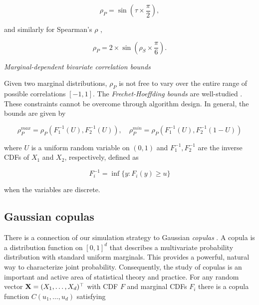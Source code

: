 \documentclass[
]{jss}
\begin{document}
\begin{equation}
\label{eq:convertKendall}
\rho_{P} = \sin \left( \tau \times \frac{\pi}{2} \right), 
\end{equation}

\noindent and similarly for Spearman's \(\rho\) \citep{K58},

\begin{equation}
\label{eq:convertSpearman}
\rho_P = 2 \times \sin \left( \rho_S \times \frac{\pi}{6} \right).
\end{equation}

\emph{Marginal-dependent bivariate correlation bounds}

Given two marginal distributions, \(\rho_P\) is not free to vary over the entire range of possible correlations \([-1,1]\). The \emph{Frechet-Hoeffding bounds} are well-studied \citep{Nelsen2007, BF17}. These constraints cannot be overcome through algorithm design. In general, the bounds are given by

\begin{equation}
\label{eq:frechet}
\rho_P^{max} = \rho_P \left( F^{-1}_1 (U), F^{-1}_2 (U) \right), \quad \rho_P^{min} = \rho_P \left( F^{-1}_1 (U), F^{-1}_2 (1 - U) \right)
\end{equation}

\noindent where \(U\) is a uniform random variable on \((0,1)\) and \(F^{-1}_1, F^{-1}_2\) are the inverse CDFs of \(X_1\) and \(X_2\), respectively, defined as

\begin{equation}
F_{i}^{-1} = \inf\{y:F_{i}(y) \geq u \}
\label{eq:inverseCDF}
\end{equation}

when the variables are discrete.

\hypertarget{gaussian-copulas}{%
\subsection{Gaussian copulas}\label{gaussian-copulas}}

There is a connection of our simulation strategy to Gaussian \emph{copulas} \citep{Nelsen2007}. A copula is a distribution function on \([0,1]^d\) that describes a multivariate probability distribution with standard uniform marginals. This provides a powerful, natural way to characterize joint probability. Consequently, the study of copulas is an important and active area of statistical theory and practice. For any random vector \({\bf X}=(X_1, \ldots, X_d)^\top\) with CDF \(F\) and marginal CDFs \(F_i\) there is a copula function \(C(u_1, \ldots, u_d)\) satisfying
\end{document}
